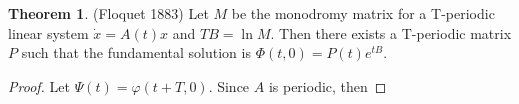 \documentclass[12pt]{article}
\theoremstyle{definition}
\newtheorem{theorem}{Theorem}[section]  %
\begin{document}
\begin{theorem}(Floquet 1883)
Let $M$ be the monodromy matrix for a T-periodic linear system $\dot{x} = A(t)x$ and $TB = \ln M$. Then
there exists a T-periodic matrix $P$ such that the fundamental solution is $\Phi (t, 0) = P(t)e^{tB}$.
\end{theorem}

\begin{proof}
Let $\Psi (t) = \varphi(t + T, 0)$. Since $A$ is periodic, then  
\end{proof}
\end{document}

